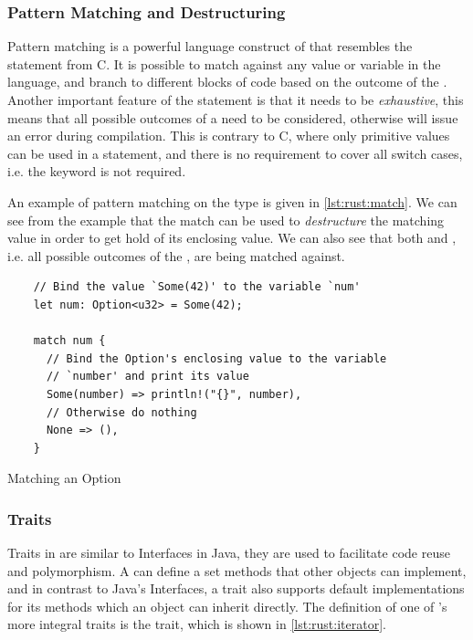 \subsubsection{Pattern Matching and Destructuring}
\label{sub:pattern_matching}

Pattern matching is a powerful language construct of {\rust} that resembles the  statement from C.
It is possible to match against any value or variable in the language, and branch to different blocks of code based on the outcome of the .
Another important feature of the  statement is that it needs to be \emph{exhaustive}, this means that all possible outcomes of a  need to be considered, otherwise {\rust} will issue an error during compilation.
This is contrary to C, where only primitive values can be used in a  statement, and there is no requirement to cover all switch cases, i.e. the  keyword is not required.

An example of pattern matching on the  type is given in \autoref{lst:rust:match}.
We can see from the example that the match can be used to \emph{destructure} the matching value in order to get hold of its enclosing value.
We can also see that both  and , i.e. all possible outcomes of the , are being matched against.

\begin{listing}[H]
  \begin{verbatim}
    // Bind the value `Some(42)' to the variable `num'
    let num: Option<u32> = Some(42);

    match num {
      // Bind the Option's enclosing value to the variable
      // `number' and print its value
      Some(number) => println!("{}", number),
      // Otherwise do nothing
      None => (),
    }
  \end{verbatim}
  \caption{Matching an Option}
  \label{lst:rust:match}
\end{listing}

\subsubsection{Traits}

Traits in {\rust} are similar to Interfaces in Java, they are used to facilitate code reuse and polymorphism.
A  can define a set methods that other objects can implement, and in contrast to Java's Interfaces, a trait also supports default implementations for its methods which an object can inherit directly.
The definition of one of {\rust}'s more integral traits is the  trait, which is shown in \autoref{lst:rust:iterator}.

